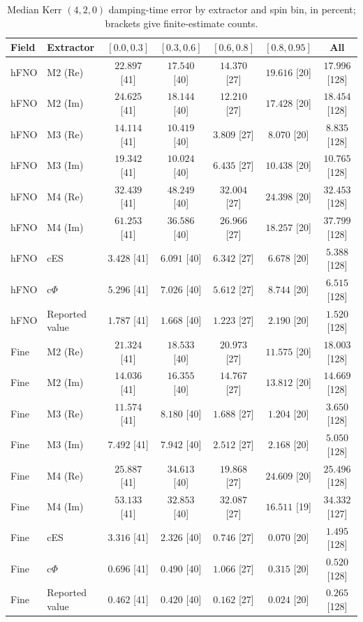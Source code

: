 \begin{table}[!htbp]
\centering
\caption{Median Kerr $(4,2,0)$ damping-time error by extractor and
spin bin, in percent; brackets give finite-estimate counts.}
\label{tab:kerr-extractors-tau}
\footnotesize
\setlength{\tabcolsep}{4pt}
\begin{tabular*}{\textwidth}{@{\extracolsep{\fill}}llccccc@{}}
\toprule
Field & Extractor & $[0.0,0.3]$ & $[0.3,0.6]$ & $[0.6,0.8]$
 & $[0.8,0.95]$ & All \\
\midrule
hFNO & M2 (Re) & $22.897$ [41] & $17.540$ [40] & $14.370$ [27] & $19.616$ [20] & $17.996$ [128] \\
hFNO & M2 (Im) & $24.625$ [41] & $18.144$ [40] & $12.210$ [27] & $17.428$ [20] & $18.454$ [128] \\
hFNO & M3 (Re) & $14.114$ [41] & $10.419$ [40] & $3.809$ [27] & $8.070$ [20] & $8.835$ [128] \\
hFNO & M3 (Im) & $19.342$ [41] & $10.024$ [40] & $6.435$ [27] & $10.438$ [20] & $10.765$ [128] \\
hFNO & M4 (Re) & $32.439$ [41] & $48.249$ [40] & $32.004$ [27] & $24.398$ [20] & $32.453$ [128] \\
hFNO & M4 (Im) & $61.253$ [41] & $36.586$ [40] & $26.966$ [27] & $18.257$ [20] & $37.799$ [128] \\
hFNO & cES & $3.428$ [41] & $6.091$ [40] & $6.342$ [27] & $6.678$ [20] & $5.388$ [128] \\
hFNO & c$\Phi$ & $5.296$ [41] & $7.026$ [40] & $5.612$ [27] & $8.744$ [20] & $6.515$ [128] \\
hFNO & Reported value & $1.787$ [41] & $1.668$ [40] & $1.223$ [27] & $2.190$ [20] & $1.520$ [128] \\
\midrule
Fine & M2 (Re) & $21.324$ [41] & $18.533$ [40] & $20.973$ [27] & $11.575$ [20] & $18.003$ [128] \\
Fine & M2 (Im) & $14.036$ [41] & $16.355$ [40] & $14.767$ [27] & $13.812$ [20] & $14.669$ [128] \\
Fine & M3 (Re) & $11.574$ [41] & $8.180$ [40] & $1.688$ [27] & $1.204$ [20] & $3.650$ [128] \\
Fine & M3 (Im) & $7.492$ [41] & $7.942$ [40] & $2.512$ [27] & $2.168$ [20] & $5.050$ [128] \\
Fine & M4 (Re) & $25.887$ [41] & $34.613$ [40] & $19.868$ [27] & $24.609$ [20] & $25.496$ [128] \\
Fine & M4 (Im) & $53.133$ [41] & $32.853$ [40] & $32.087$ [27] & $16.511$ [19] & $34.332$ [127] \\
Fine & cES & $3.316$ [41] & $2.326$ [40] & $0.746$ [27] & $0.070$ [20] & $1.495$ [128] \\
Fine & c$\Phi$ & $0.696$ [41] & $0.490$ [40] & $1.066$ [27] & $0.315$ [20] & $0.520$ [128] \\
Fine & Reported value & $0.462$ [41] & $0.420$ [40] & $0.162$ [27] & $0.024$ [20] & $0.265$ [128] \\
\bottomrule
\end{tabular*}
\end{table}
